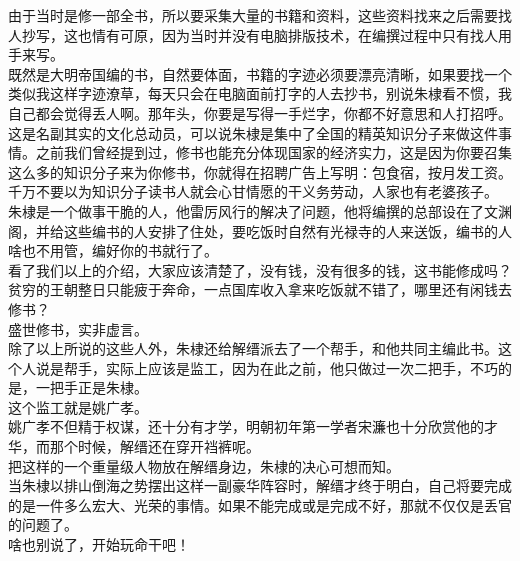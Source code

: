\begin{multicols}{\theparacolNo}
由于当时是修一部全书，所以要采集大量的书籍和资料，这些资料找来之后需要找人抄写，这也情有可原，因为当时并没有电脑排版技术，在编撰过程中只有找人用手来写。\\

既然是大明帝国编的书，自然要体面，书籍的字迹必须要漂亮清晰，如果要找一个类似我这样字迹潦草，每天只会在电脑面前打字的人去抄书，别说朱棣看不惯，我自己都会觉得丢人啊。那年头，你要是写得一手烂字，你都不好意思和人打招呼。\\

这是名副其实的文化总动员，可以说朱棣是集中了全国的精英知识分子来做这件事情。之前我们曾经提到过，修书也能充分体现国家的经济实力，这是因为你要召集这么多的知识分子来为你修书，你就得在招聘广告上写明：包食宿，按月发工资。千万不要以为知识分子读书人就会心甘情愿的干义务劳动，人家也有老婆孩子。\\

朱棣是一个做事干脆的人，他雷厉风行的解决了问题，他将编撰的总部设在了文渊阁，并给这些编书的人安排了住处，要吃饭时自然有光禄寺的人来送饭，编书的人啥也不用管，编好你的书就行了。\\

看了我们以上的介绍，大家应该清楚了，没有钱，没有很多的钱，这书能修成吗？\\

贫穷的王朝整日只能疲于奔命，一点国库收入拿来吃饭就不错了，哪里还有闲钱去修书？\\

盛世修书，实非虚言。\\

除了以上所说的这些人外，朱棣还给解缙派去了一个帮手，和他共同主编此书。这个人说是帮手，实际上应该是监工，因为在此之前，他只做过一次二把手，不巧的是，一把手正是朱棣。\\

这个监工就是姚广孝。\\

姚广孝不但精于权谋，还十分有才学，明朝初年第一学者宋濂也十分欣赏他的才华，而那个时候，解缙还在穿开裆裤呢。\\

把这样的一个重量级人物放在解缙身边，朱棣的决心可想而知。\\

当朱棣以排山倒海之势摆出这样一副豪华阵容时，解缙才终于明白，自己将要完成的是一件多么宏大、光荣的事情。如果不能完成或是完成不好，那就不仅仅是丢官的问题了。\\

啥也别说了，开始玩命干吧！\\


\end{multicols}

